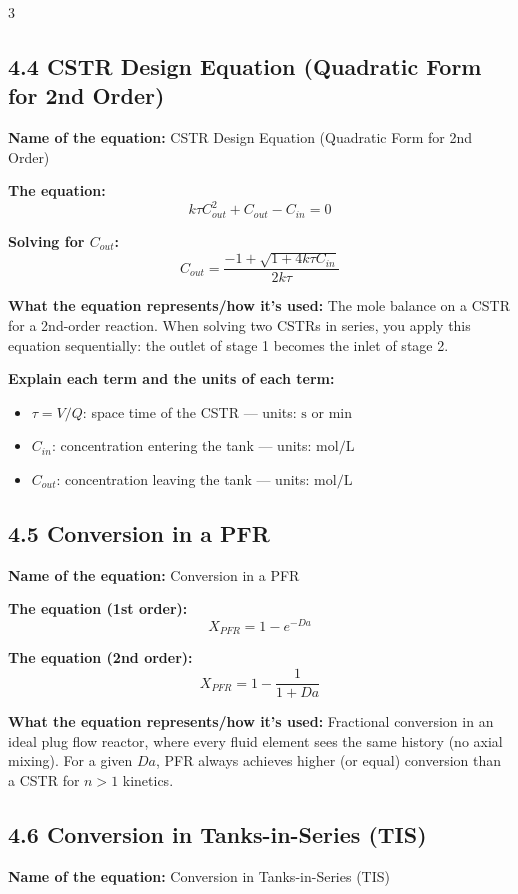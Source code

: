 \documentclass[8pt]{extarticle}
\begin{document}
\begin{multicols*}{3}
\subsection*{4.4 CSTR Design Equation (Quadratic Form for 2nd Order)}

\textbf{Name of the equation:} CSTR Design Equation (Quadratic Form for 2nd Order)

\textbf{The equation:}
\[
k\tau C_{out}^2+C_{out}-C_{in}=0
\]

\textbf{Solving for \(C_{out}\):}
\[
C_{out}=\frac{-1+\sqrt{1+4k\tau C_{in}}}{2k\tau}
\]

\textbf{What the equation represents/how it's used:} The mole balance on a CSTR for a 2nd-order reaction. When solving two CSTRs in series, you apply this equation sequentially: the outlet of stage 1 becomes the inlet of stage 2.

\textbf{Explain each term and the units of each term:}
\begin{itemize}
\item \(\tau=V/Q\): space time of the CSTR --- units: \(\mathrm{s}\) or \(\mathrm{min}\)
\item \(C_{in}\): concentration entering the tank --- units: \(\mathrm{mol/L}\)
\item \(C_{out}\): concentration leaving the tank --- units: \(\mathrm{mol/L}\)
\end{itemize}

\subsection*{4.5 Conversion in a PFR}

\textbf{Name of the equation:} Conversion in a PFR

\textbf{The equation (1st order):}
\[
X_{PFR}=1-e^{-Da}
\]

\textbf{The equation (2nd order):}
\[
X_{PFR}=1-\frac{1}{1+Da}
\]

\textbf{What the equation represents/how it's used:} Fractional conversion in an ideal plug flow reactor, where every fluid element sees the same history (no axial mixing). For a given \(Da\), PFR always achieves higher (or equal) conversion than a CSTR for \(n>1\) kinetics.

\subsection*{4.6 Conversion in Tanks-in-Series (TIS)}

\textbf{Name of the equation:} Conversion in Tanks-in-Series (TIS)


\end{multicols*}
\end{document}

